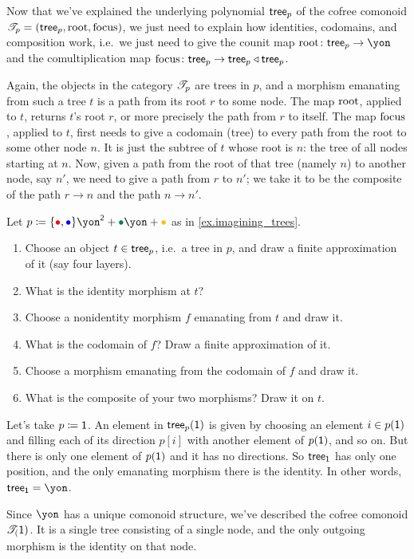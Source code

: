 \documentclass[DynamicalBook]{subfiles}
\begin{document}
Now that we've explained the underlying polynomial $\mathsf{tree}_p$ of the cofree comonoid $\mathscr{T}_{p}=(\mathsf{tree}_p,\mathrm{root},\mathrm{focus})$, we just need to explain how identities, codomains, and composition work, i.e.\ we just need to give the counit map $\rt\colon\tr_p\to\yon$ and the comultiplication map $\mathrm{focus}\colon\mathsf{tree}_p\to\mathsf{tree}_p\mathbin{\triangleleft}\mathsf{tree}_p$. 

Again, the objects in the category $\mathscr{T}_{p}$ are trees in $p$, and a morphism emanating from such a tree $t$ is a path from its root $r$ to some node. The map $\mathrm{root}$, applied to $t$, returns $t$'s root $r$, or more precisely the path from $r$ to itself. The map $\mathrm{focus}$, applied to $t$, first needs to give a codomain (tree) to every path from the root to some other node $n$. It is just the subtree of $t$ whose root is $n$: the tree of all nodes starting at $n$. Now, given a path from the root of that tree (namely $n$) to another node, say $n'$, we need to give a path from $r$ to $n'$; we take it to be the composite of the path $r\to n$ and the path $n\to n'$.

\begin{exercise}
Let $p\coloneqq\{\bul[red],\bul[blue]\}\yon^\2+\bul[dgreen]\yon+\bul[dyellow]$ as in \cref{ex.imagining_trees}.
\begin{enumerate}
	\item Choose an object $t\in \mathsf{tree}_p$, i.e.\ a tree in $p$, and draw a finite approximation of it (say four layers).
	\item What is the identity morphism at $t$?
	\item Choose a nonidentity morphism $f$ emanating from $t$ and draw it.
	\item What is the codomain of $f$? Draw a finite approximation of it.
	\item Choose a morphism emanating from the codomain of $f$ and draw it.
	\item What is the composite of your two morphisms? Draw it on $t$.
\qedhere
\end{enumerate}
\end{exercise}

\begin{example}
Let's take $p\coloneqq\textsf{1}$. An element in $\mathsf{tree}_p(\textsf{1})$ is given by choosing an element $i\in p(\textsf{1})$ and filling each of its direction $p[i]$ with another element of $p(\textsf{1})$, and so on. But there is only one element of $p(\textsf{1})$ and it has no directions. So $\mathsf{tree}_{\textsf{1}}$ has only one position, and the only emanating morphism there is the identity. In other words, $\tr_\1=\yon$.

Since $\yon$ has a unique comonoid structure, we've described the cofree comonoid $\mathscr{T}_{(}\textsf{1})$. It is a single tree consisting of a single node, and the only outgoing morphism is the identity on that node.
\end{example}
\end{document}
